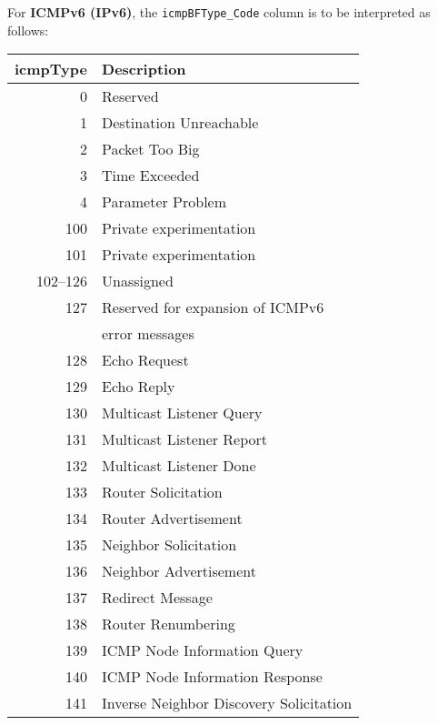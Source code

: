 \documentclass[documentation]{subfiles}
\begin{document}
\clearpage
For {\bf ICMPv6 (IPv6)}, the {\tt icmpBFType\_Code} column is to be interpreted as follows:\\

\begin{small}
    \begin{minipage}{0.45\textwidth}
        \begin{longtable} {rl}
            \toprule
            {\bf icmpType} & {\bf Description}\\
            \midrule\endhead%
            0   & Reserved\\
            1   & Destination Unreachable\\
            2   & Packet Too Big\\
            3   & Time Exceeded\\
            4   & Parameter Problem\\
            100 & Private experimentation\\
            101 & Private experimentation\\
            102--126 & Unassigned\\
            127 & Reserved for expansion of ICMPv6\\
                & error messages\\
            128 & Echo Request\\
            129 & Echo Reply\\
            130 & Multicast Listener Query\\
            131 & Multicast Listener Report\\
            132 & Multicast Listener Done\\
            133 & Router Solicitation\\
            134 & Router Advertisement\\
            135 & Neighbor Solicitation\\
            136 & Neighbor Advertisement\\
            137 & Redirect Message\\
            138 & Router Renumbering\\
            139 & ICMP Node Information Query\\
            140 & ICMP Node Information Response\\
            141 & Inverse Neighbor Discovery Solicitation \\
            \bottomrule
        \end{longtable}
    \end{minipage}

\end{small}
\end{document}
